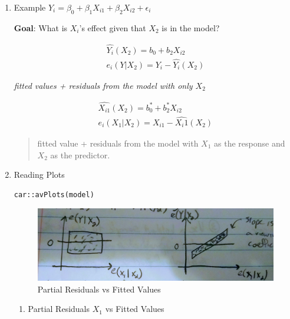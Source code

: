 \documentclass[11pt]{article}
\begin{document}
\begin{enumerate}
\item Example
\label{sec:orgc99aea6}
\(Y_i = \beta_0 + \beta_1 X_{i1} + \beta_2 X_{i2} + \epsilon_i\)

\textbf{Goal}: What is \(X_i\)'s effect given that \(X_2\) is in the model?

\begin{equation}
\begin{split}
\hat{Y_i}(X_2) = b_0 + b_2 X_{i2}\\
e_i(Y | X_2) = Y_i - \hat{Y_i}(X_2)
\end{split}
\end{equation}

\emph{fitted values + residuals from the model with only \(X_2\)}

\begin{equation}
\begin{split}
\hat{X_{i1}}(X_2) = b_0^* + b_2^* X_{i2}\\
e_i(X_1 | X_2) = X_{i1} - \hat{X_i1} (X_2)
\end{split}
\end{equation}

\begin{quote}
fitted value + residuals from the model with \(X_1\) as the response and \(X_2\) as
the predictor.
\end{quote}

\item Reading Plots
\label{sec:org922c95f}

\begin{verbatim}
car::avPlots(model)
\end{verbatim}

\begin{figure}[htbp]
\centering
\includegraphics[width=.9\linewidth]{./images/avPlots.jpg}
\caption{\label{fig:orgcd5c716}Partial Residuals vs Fitted Values}
\end{figure}

\begin{enumerate}
\item Partial Residuals \(X_1\) vs Fitted Values


\end{enumerate}
\end{enumerate}
\end{document}
